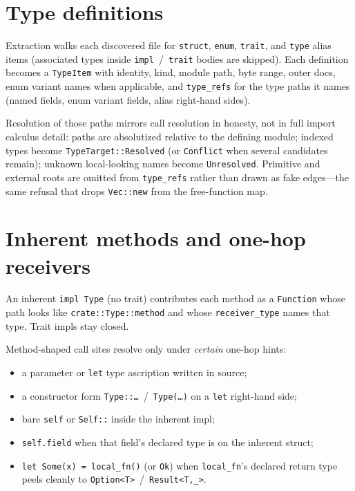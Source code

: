 \documentclass[11pt,a4paper,oneside]{report}
\begin{document}
\section{Type definitions}

Extraction walks each discovered file for \texttt{struct}, \texttt{enum},
\texttt{trait}, and \texttt{type} alias items (associated types inside
\texttt{impl}~/~\texttt{trait} bodies are skipped). Each definition becomes a
\texttt{TypeItem} with identity, kind, module path, byte range, outer docs,
enum variant names when applicable, and \texttt{type\_refs} for the type paths
it names (named fields, enum variant fields, alias right-hand sides).

Resolution of those paths mirrors call resolution in honesty, not in full
import calculus detail: paths are absolutized relative to the defining module;
indexed types become \texttt{TypeTarget::Resolved} (or \texttt{Conflict} when
several candidates remain); unknown local-looking names become
\texttt{Unresolved}. Primitive and external roots are omitted from
\texttt{type\_refs} rather than drawn as fake edges---the same refusal that
drops \texttt{Vec::new} from the free-function map.

\section{Inherent methods and one-hop receivers}

An inherent \texttt{impl Type} (no trait) contributes each method as a
\texttt{Function} whose path looks like \texttt{crate::Type::method} and whose
\texttt{receiver\_type} names that type. Trait impls stay closed.

Method-shaped call sites resolve only under \emph{certain} one-hop hints:

\begin{itemize}[nosep]
  \item a parameter or \texttt{let} type ascription written in source;
  \item a constructor form \texttt{Type::\ldots{}}~/~\texttt{Type(\ldots{})} on a
    \texttt{let} right-hand side;
  \item bare \texttt{self} or \texttt{Self::} inside the inherent impl;
  \item \texttt{self.field} when that field's declared type is on the inherent
    struct;
  \item \texttt{let Some(x) = local\_fn()} (or \texttt{Ok}) when
    \texttt{local\_fn}'s declared return type peels cleanly to
    \texttt{Option<T>}~/~\texttt{Result<T,\_>}.
\end{itemize}
\end{document}
